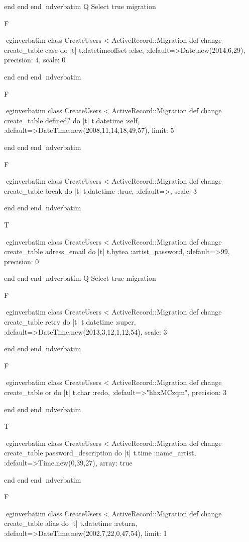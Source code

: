     end 
  end 
end
nd{verbatim}
Q
 Select true migration

F

egin{verbatim}
 class CreateUsers < ActiveRecord::Migration 
  def change 
    create_table case do |t| 
      t.datetimeoffset :else, :default=>Date.new(2014,6,29), precision: 4, scale: 0
    
    end 
  end 
end
nd{verbatim}

F

egin{verbatim}
 class CreateUsers < ActiveRecord::Migration 
  def change 
    create_table defined? do |t| 
      t.datetime :self, :default=>DateTime.new(2008,11,14,18,49,57), limit: 5
    
    end 
  end 
end
nd{verbatim}

F

egin{verbatim}
 class CreateUsers < ActiveRecord::Migration 
  def change 
    create_table break do |t| 
      t.datetime :true, :default=>, scale: 3
    
    end 
  end 
end
nd{verbatim}

T

egin{verbatim}
 class CreateUsers < ActiveRecord::Migration 
  def change 
    create_table adress_email do |t| 
      t.bytea :artist_password, :default=>99, precision: 0
    
    end 
  end 
end
nd{verbatim}
Q
 Select true migration

F

egin{verbatim}
 class CreateUsers < ActiveRecord::Migration 
  def change 
    create_table retry do |t| 
      t.datetime :super, :default=>DateTime.new(2013,3,12,1,12,54), scale: 3
    
    end 
  end 
end
nd{verbatim}

F

egin{verbatim}
 class CreateUsers < ActiveRecord::Migration 
  def change 
    create_table or do |t| 
      t.char :redo, :default=>"hhxMCzqm", precision: 3
    
    end 
  end 
end
nd{verbatim}

T

egin{verbatim}
 class CreateUsers < ActiveRecord::Migration 
  def change 
    create_table password_description do |t| 
      t.time :name_artist, :default=>Time.new(0,39,27), array: true
    
    end 
  end 
end
nd{verbatim}

F

egin{verbatim}
 class CreateUsers < ActiveRecord::Migration 
  def change 
    create_table alias do |t| 
      t.datetime :return, :default=>DateTime.new(2002,7,22,0,47,54), limit: 1
    
